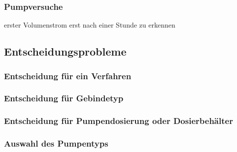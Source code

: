 \FloatBarrier 

\subsubsection*{Pumpversuche}

erster Volumenstrom erst nach einer Stunde zu erkennen 



\subsection{Entscheidungsprobleme}
\label{subsec:entscheidungsprobleme}
\subsubsection{Entscheidung für ein Verfahren}

\subsubsection{Entscheidung für Gebindetyp}

\subsubsection{Entscheidung für Pumpendosierung oder Dosierbehälter}

\subsubsection{Auswahl des Pumpentyps}

